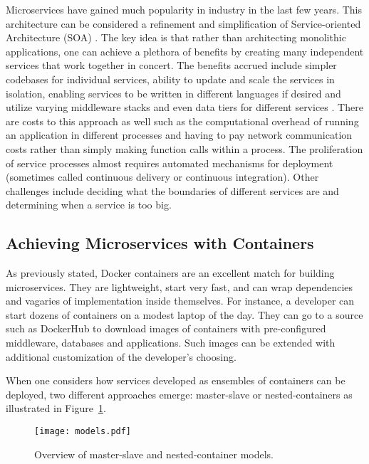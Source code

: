 \documentclass[conference]{IEEEtran}
\begin{document}
Microservices have gained much popularity in industry in the last few years.
This architecture can be considered a refinement and simplification of
Service-oriented Architecture (SOA) \cite{erl_2005}. The key idea is that rather 
than architecting monolithic applications, one can achieve a plethora of 
benefits by creating many independent services that work together in concert. 
The benefits accrued include simpler codebases for individual services, ability 
to update and scale the services in isolation, enabling services to be written 
in different languages if desired and utilize varying middleware stacks and even 
data tiers for different services \cite{namiot_14}. There are costs to this 
approach as well \cite{lewis_microservices} such as the computational overhead 
of running an application in different processes and having to pay network 
communication costs rather than simply making function calls within a process. 
The proliferation of service processes almost requires automated mechanisms for 
deployment (sometimes called continuous delivery or continuous integration). 
Other challenges include deciding what the boundaries of different services are 
and determining when a service is too big.

\subsection{Achieving Microservices with Containers}

As previously stated, Docker containers are an excellent match for building 
microservices. They are lightweight, start very fast, and can wrap dependencies 
and vagaries of implementation inside themselves. For instance, a developer can 
start dozens of containers on a modest laptop of the day. They can go to a 
source such as DockerHub to download images of containers with pre-configured 
middleware, databases and applications. Such images can be extended 
with additional customization of the developer's choosing.

When one considers how services developed as ensembles of containers can be
deployed, two different approaches emerge: master-slave or nested-containers
as illustrated in Figure~\ref{fig:models}.

\begin{figure}[bth!]
    \center
    \texttt{[image: models.pdf]}
    \caption{Overview of master-slave and nested-container models.}
    \label{fig:models}
\end{figure}
\end{document}

